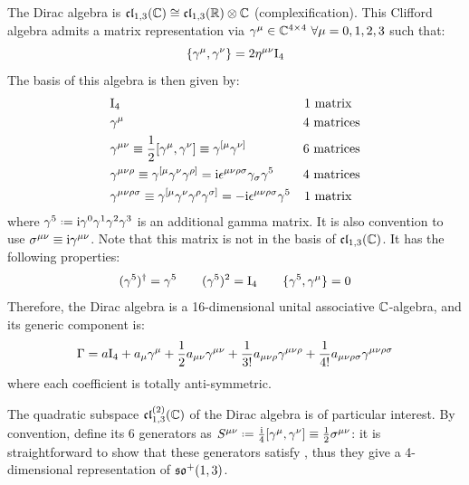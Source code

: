 The Dirac algebra is $ \mathfrak{cl}_{1,3}(\mathbb{C}) \cong \mathfrak{cl}_{1,3}(\mathbb{R}) \otimes \mathbb{C} $ (complexification). This Clifford algebra admits a matrix representation via $ \gamma^\mu \in \mathbb{C}^{4 \times 4} \,\,\forall \mu = 0,1,2,3 $ such that:
\begin{equation}
  \{\gamma^\mu , \gamma^\nu\} = 2 \eta^{\mu \nu} \mathrm{I}_4
\end{equation}
The basis of this algebra is then given by:
\begin{align*}
  & \mathrm{I}_4 & \text{1 matrix}\,\,\,\, \\
  & \gamma^\mu & \text{4 matrices} \\
  & \gamma^{\mu \nu} \equiv \frac{1}{2} [\gamma^\mu, \gamma^\nu] \equiv \gamma^{[\mu} \gamma^{\nu]} & \text{6 matrices} \\
  & \gamma^{\mu \nu \rho} \equiv \gamma^{[\mu} \gamma^\nu \gamma^{\rho]} = \mathrm{i} \epsilon^{\mu \nu \rho \sigma} \gamma_\sigma \gamma^5 & \text{4 matrices} \\
  & \gamma^{\mu \nu \rho \sigma} \equiv \gamma^{[\mu} \gamma^\nu \gamma^\rho \gamma^{\sigma]} = - \mathrm{i} \epsilon^{\mu \nu \rho \sigma} \gamma^5 & \text{1 matrix}\,\,\,\,
\end{align*}
where $ \gamma^5 \defeq \img \gamma^0 \gamma^1 \gamma^2 \gamma^3 $ is an additional gamma matrix. It is also convention to use $ \sigma^{\mu \nu} \equiv \mathrm{i} \gamma^{\mu \nu} $. Note that this matrix is not in the basis of $ \mathfrak{cl}_{1,3}(\mathbb{C}) $. It has the following properties:
\begin{equation*}
  (\gamma^5)^\dagger = \gamma^5
  \qquad
  (\gamma^5)^2 = \mathrm{I}_4
  \qquad
  \{\gamma^5 , \gamma^\mu\} = 0
\end{equation*}
Therefore, the Dirac algebra is a 16-dimensional unital associative $ \mathbb{C} $-algebra, and its generic component is:
\begin{equation}
  \Gamma = a \mathrm{I}_4 + a_\mu \gamma^\mu + \frac{1}{2} a_{\mu \nu} \gamma^{\mu \nu} + \frac{1}{3!} a_{\mu \nu \rho} \gamma^{\mu \nu \rho} + \frac{1}{4!} a_{\mu \nu \rho \sigma} \gamma^{\mu \nu \rho \sigma}
\end{equation}
where each coefficient is totally anti-symmetric.

The quadratic subspace $ \mathfrak{cl}_{1,3}^{(2)}(\mathbb{C}) $ of the Dirac algebra is of particular interest. By convention, define its 6 generators as $ S^{\mu \nu} \defeq \frac{\img}{4} [\gamma^\mu , \gamma^\nu] \equiv \frac{1}{2} \sigma^{\mu \nu} $: it is straightforward to show that these generators satisfy , thus they give a 4-dimensional representation of $ \mathfrak{so}^+(1,3) $.

